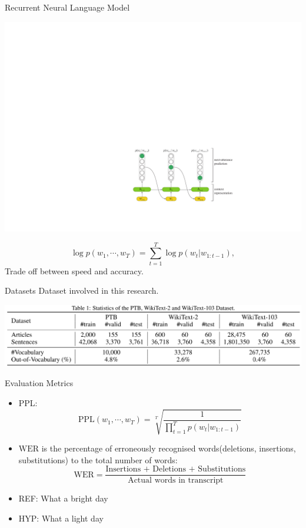 \documentclass[english]{beamer} %
\begin{document}
\begin{frame}[<+->]{Recurrent Neural Language Model}

  \begin{center}
    \includegraphics[scale=0.8]{lm}
  \end{center}

  \begin{equation}
 \log p(w_1,\cdots, w_T ) = \sum_{t=1}^T \log p(w_t | w_{1:t-1}),
\end{equation}
Trade off between speed and accuracy.
\end{frame}

\begin{frame}[<+->]{Datasets}
Dataset involved in this research.
\begin{center}
    \includegraphics[scale=0.33]{data.png}
  \end{center}
\end{frame}
\begin{frame}[<+->]{Evaluation Metrics}
\begin{itemize}
  \item PPL:\begin{equation}\label{equ:ppl}
   \mathrm{PPL}(w_1,\cdots,w_T)=\sqrt[T]{\frac{1}{\prod_{t=1}^T p(w_t|w_{1:t-1})}}
\end{equation}

\item $\mathrm{WER}$ is the percentage of erroneously recognised words(deletions, insertions, substitutions) to the total number of words:
\begin{equation}\label{equ:wer}
  \mathrm{WER} = \frac{\text{Insertions + Deletions + Substitutions}}{\text{Actual~words~in~transcript}}
\end{equation}
\item REF: What a bright day

\item HYP: What a light day
\end{itemize}
\end{frame}
\end{document}

